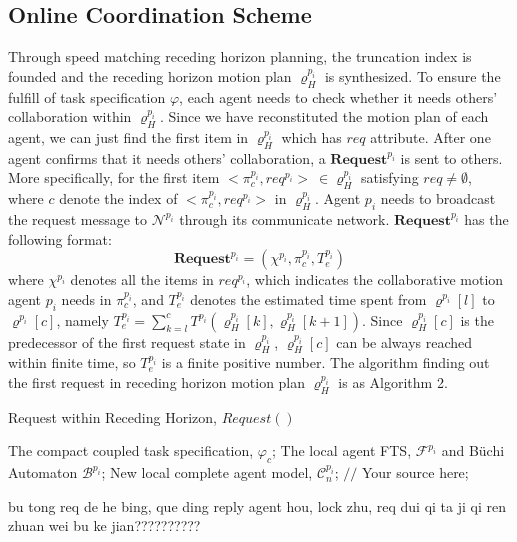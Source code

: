 \documentclass[journal]{IEEEtran}
\begin{document}
\subsection{Online Coordination Scheme}
Through speed matching receding horizon planning, the truncation index is founded and the receding horizon motion plan $\varrho^{p_i}_H$ is synthesized. To ensure the fulfill of task specification $\varphi$, each agent needs to check whether it needs others' collaboration within $\varrho^{p_i}_H$. Since we have reconstituted the motion plan of each agent, we can just find the first item in $\varrho^{p_i}_H$ which has $req$ attribute.  After one agent confirms that it needs others' collaboration, a $\textbf{Request}^{p_i}$ is sent to others. More specifically, for the first item $<\pi_c^{p_i},req^{p_i}>\ \in \varrho^{p_i}_H$ satisfying $req \neq \emptyset$, where $c$ denote the index of $<\pi_c^{p_i},req^{p_i}>$ in $\varrho^{p_i}_H$. Agent $p_i$ needs to broadcast the request message to $\mathcal{N}^{p_i}$ through its communicate network. $\textbf{Request}^{p_i}$ has the following format:
$$\textbf{Request}^{p_i} = (\chi^{p_i},\pi_c^{p_i},T^{p_i}_e)$$
where $\chi^{p_i}$ denotes all the items in $req^{p_i}$, which indicates the collaborative motion agent $p_i$ needs in $\pi_c^{p_i}$, and $T^{p_i}_e$ denotes the estimated time spent from $\varrho^{p_i}[l]$ to $\varrho^{p_i}[c]$, namely $T^{p_i}_e=\sum_{k=l}^{c}T^{p_i}(\varrho^{p_i}_H[k],\varrho^{p_i}_H[k+1])$. Since $\varrho^{p_i}_H[c]$ is the predecessor of the first request state in $\varrho^{p_i}_H$, $\varrho^{p_i}_H[c]$ can be always reached within finite time, so $T^{p_i}_e$ is a finite positive number.
The algorithm finding out the first request in receding horizon motion plan $\varrho^{p_i}_H$ is as Algorithm 2.\par
\begin{algorithm}[hb]
  \caption{ Request within Receding Horizon, $Request()$ }
  \label{alg:Framwork}
  \begin{algorithmic}[1]
    \Require
      The compact coupled task specification, $\varphi_c$;
      The local agent FTS, $\mathcal{F}^{p_i}$ and B\"{u}chi Automaton $\mathcal{B}^{p_i}$;
    \Ensure
      New local complete agent model, $\mathcal{C}^{p_i}_n$;
          \State $//$ Your source here;
        \EndFor
  \end{algorithmic}
\end{algorithm}
bu tong req de he bing, que ding reply agent hou, lock zhu, req dui qi ta ji qi ren zhuan wei bu ke jian??????????
\end{document}
